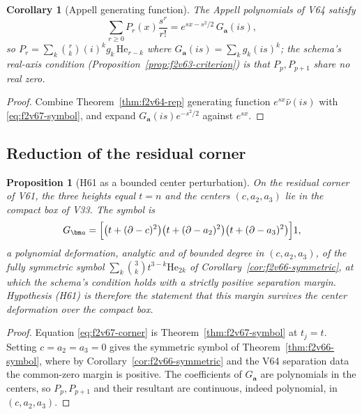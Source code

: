 \documentclass[11pt]{article}
\newtheorem{proposition}[theorem]{Proposition}
\newtheorem{corollary}[theorem]{Corollary}
\theoremstyle{definition}
\theoremstyle{remark}
\begin{document}
\begin{corollary}[Appell generating function]
\label{cor:f2v67-genfun}
The Appell polynomials of V64 satisfy
\begin{equation}
 \sum_{r\ge0}P_r(x)\frac{s^r}{r!}=e^{sx-s^2/2}\,G_{\bm a}(is),
 \label{eq:f2v67-genfun}
\end{equation}
so \(P_r=\sum_{k}\binom rk (i)^kg_k\,\mathrm{He}_{r-k}\) where
\(G_{\bm a}(is)=\sum_kg_k(is)^k\); the schema's real-axis condition
(Proposition~\ref{prop:f2v63-criterion}) is that \(P_p,P_{p+1}\) share no
real zero.
\end{corollary}

\begin{proof}
Combine Theorem~\ref{thm:f2v64-rep} generating function
\(e^{sx}\widehat\nu(is)\) with \eqref{eq:f2v67-symbol}, and expand
\(G_{\bm a}(is)e^{-s^2/2}\) against \(e^{sx}\).
\end{proof}

\subsection{Reduction of the residual corner}

\begin{proposition}[H61 as a bounded center perturbation]
\label{prop:f2v67-h61}
On the residual corner of V61, the three heights equal \(t=n\) and the
centers \((c,a_2,a_3)\) lie in the compact box of V33.  The symbol is
\begin{equation}
 G_{\bm a}=\Bigl[\bigl(t+(\partial-c)^2\bigr)\bigl(t+(\partial-a_2)^2\bigr)
 \bigl(t+(\partial-a_3)^2\bigr)\Bigr]1 ,
 \label{eq:f2v67-corner}
\end{equation}
a polynomial deformation, analytic and of bounded degree in
\((c,a_2,a_3)\), of the fully symmetric symbol
\(\sum_k\binom3k t^{3-k}\mathrm{He}_{2k}\) of
Corollary~\ref{cor:f2v66-symmetric}, at which the schema's condition
holds with a strictly positive separation margin.  Hypothesis (H61) is
therefore the statement that this margin survives the center deformation
over the compact box.
\end{proposition}

\begin{proof}
Equation \eqref{eq:f2v67-corner} is
Theorem~\ref{thm:f2v67-symbol} at \(t_j=t\).  Setting
\(c=a_2=a_3=0\) gives the symmetric symbol of
Theorem~\ref{thm:f2v66-symbol}, where by
Corollary~\ref{cor:f2v66-symmetric} and the V64 separation data the
common-zero margin is positive.  The coefficients of \(G_{\bm a}\) are
polynomials in the centers, so \(P_p,P_{p+1}\) and their resultant are
continuous, indeed polynomial, in \((c,a_2,a_3)\).
\end{proof}
\end{document}
